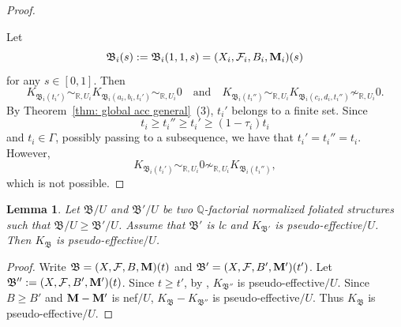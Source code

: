 \documentclass[11pt,reqno]{amsart}
\numberwithin{equation}{section}
\newcommand{\Mm}{{\bf{M}}}
\newcommand{\Bb}{{\mathfrak{B}}}
\newcommand{\Ff}{\mathcal{F}}
\newcommand{\Ii}{\Gamma}
\newtheorem{lem}[thm]{Lemma}
\theoremstyle{definition}
\begin{document}
\begin{proof}
\begin{itemize}
\end{itemize}
Let
$$\Bb_i(s):=\Bb_i(1,1,s)=(X_i,\Ff_i,B_i,\Mm_i)(s)$$
for any $s\in [0,1]$. Then 
$$K_{\Bb_i(t_i')}\sim_{\mathbb R,U_i}K_{\Bb_i(a_i,b_i,t_i')}\sim_{\mathbb R,U_i}0\quad \text{and}\quad K_{\Bb_i(t_i'')}\sim_{\mathbb R,U_i}K_{\Bb_i(c_i,d_i,t_i'')}\not\sim_{\mathbb R,U_i}0.$$
By Theorem~\ref{thm: global acc general}~(3), $t_i'$ belongs to a finite set. Since
$$t_i\geq t_i''\geq t_i'\geq (1-\tau_i)t_i$$
and $t_i\in\Ii$, possibly passing to a subsequence, we have that $t_i'=t_i''=t_i$. However,
$$K_{\Bb_i(t_i')}\sim_{\mathbb R,U_i}0\not\sim_{\mathbb R,U_i}K_{\Bb_i(t_i'')},$$
which is not possible.
\end{proof}

\begin{lem}\label{lem: pe preserved under order}
    Let $\Bb/U$ and $\Bb'/U$ be two $\mathbb Q$-factorial normalized foliated structures such that $\Bb/U\geq\Bb'/U$. Assume that $\Bb'$ is lc and $K_{\Bb'}$ is pseudo-effective$/U$. Then $K_{\Bb}$ is pseudo-effective$/U$.
\end{lem}
\begin{proof}
    Write $\Bb=(X,\Ff,B,\Mm)(t)$ and $\Bb'=(X,\Ff,B',\Mm')(t')$.
    Let $\Bb'':=(X,\Ff,B',\Mm')(t)$. Since $t\geq t'$, by \cite[Theorem~5.1]{Cas+25a}, $K_{\Bb''}$ is pseudo-effective$/U$. Since $B\geq B'$ and $\Mm-\Mm'$ is nef$/U$, $K_{\Bb}-K_{\Bb''}$ is pseudo-effective$/U$. Thus  $K_{\Bb}$ is pseudo-effective$/U$.
\end{proof}
\end{document}
